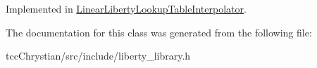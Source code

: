 Implemented in \hyperlink{classLinearLibertyLookupTableInterpolator_a9b0f96185327e7cb0e5c315691eb6579}{Linear\-Liberty\-Lookup\-Table\-Interpolator}.



The documentation for this class was generated from the following file\-:\begin{DoxyCompactItemize}
\item 
tcc\-Chrystian/src/include/liberty\-\_\-library.\-h\end{DoxyCompactItemize}
